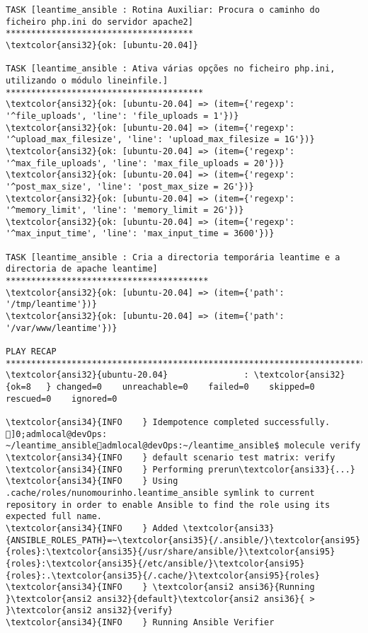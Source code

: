 \documentclass{scrartcl}
\begin{document}
\begin{Verbatim}
TASK [leantime_ansible : Rotina Auxiliar: Procura o caminho do ficheiro php.ini do servidor apache2] *************************************
\textcolor{ansi32}{ok: [ubuntu-20.04]}

TASK [leantime_ansible : Ativa várias opções no ficheiro php.ini, utilizando o módulo lineinfile.] ***************************************
\textcolor{ansi32}{ok: [ubuntu-20.04] => (item={'regexp': '^file_uploads', 'line': 'file_uploads = 1'})}
\textcolor{ansi32}{ok: [ubuntu-20.04] => (item={'regexp': '^upload_max_filesize', 'line': 'upload_max_filesize = 1G'})}
\textcolor{ansi32}{ok: [ubuntu-20.04] => (item={'regexp': '^max_file_uploads', 'line': 'max_file_uploads = 20'})}
\textcolor{ansi32}{ok: [ubuntu-20.04] => (item={'regexp': '^post_max_size', 'line': 'post_max_size = 2G'})}
\textcolor{ansi32}{ok: [ubuntu-20.04] => (item={'regexp': '^memory_limit', 'line': 'memory_limit = 2G'})}
\textcolor{ansi32}{ok: [ubuntu-20.04] => (item={'regexp': '^max_input_time', 'line': 'max_input_time = 3600'})}

TASK [leantime_ansible : Cria a directoria temporária leantime e a directoria de apache leantime] ****************************************
\textcolor{ansi32}{ok: [ubuntu-20.04] => (item={'path': '/tmp/leantime'})}
\textcolor{ansi32}{ok: [ubuntu-20.04] => (item={'path': '/var/www/leantime'})}

PLAY RECAP *******************************************************************************************************************************
\textcolor{ansi32}{ubuntu-20.04}               : \textcolor{ansi32}{ok=8   } changed=0    unreachable=0    failed=0    skipped=0    rescued=0    ignored=0

\textcolor{ansi34}{INFO    } Idempotence completed successfully.
]0;admlocal@devOps: ~/leantime_ansibleadmlocal@devOps:~/leantime_ansible$ molecule verify
\textcolor{ansi34}{INFO    } default scenario test matrix: verify
\textcolor{ansi34}{INFO    } Performing prerun\textcolor{ansi33}{...}
\textcolor{ansi34}{INFO    } Using .cache/roles/nunomourinho.leantime_ansible symlink to current repository in order to enable Ansible to find the role using its expected full name.
\textcolor{ansi34}{INFO    } Added \textcolor{ansi33}{ANSIBLE_ROLES_PATH}=~\textcolor{ansi35}{/.ansible/}\textcolor{ansi95}{roles}:\textcolor{ansi35}{/usr/share/ansible/}\textcolor{ansi95}{roles}:\textcolor{ansi35}{/etc/ansible/}\textcolor{ansi95}{roles}:.\textcolor{ansi35}{/.cache/}\textcolor{ansi95}{roles}
\textcolor{ansi34}{INFO    } \textcolor{ansi2 ansi36}{Running }\textcolor{ansi2 ansi32}{default}\textcolor{ansi2 ansi36}{ > }\textcolor{ansi2 ansi32}{verify}
\textcolor{ansi34}{INFO    } Running Ansible Verifier


\end{Verbatim}
\end{document}
